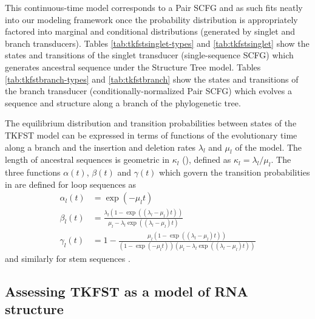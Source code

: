 \documentclass[10pt]{article}
\begin{document}
This continuous-time model corresponds to a Pair SCFG and as such
fits neatly into our modeling framework once the probability
distribution is appropriately factored into marginal and conditional
distributions (generated by singlet and branch transducers).
Tables \ref{tab:tkfstsinglet-types} and \ref{tab:tkfstsinglet} show the states 
and transitions of the singlet transducer (single-sequence SCFG) 
which generates ancestral sequence under the Structure Tree model.
Tables \ref{tab:tkfstbranch-types} and \ref{tab:tkfstbranch} show the states
and transitions of the branch transducer (conditionally-normalized Pair SCFG)
which evolves a sequence and structure along a branch of the phylogenetic tree.

The equilibrium distribution and transition probabilities between states of the TKFST model can be 
expressed in terms of functions of the evolutionary time along a branch
and the insertion and deletion rates $\lambda_l$ and $\mu_l$ of the model.
The length of ancestral sequences is geometric in $\kappa_l$ (), defined as $\kappa_l = \lambda_l / \mu_l$.
The three functions $\alpha(t)$, $\beta(t)$ and $\gamma(t)$ which govern 
the transition probabilities in  are defined
for loop sequences as
\begin{align}
  \alpha_l (t) &= \exp \left( -\mu_l t \right) \nonumber \\
  \beta_l (t) &= \frac{\lambda_l \left( 1 - \exp \left((\lambda_l - \mu_l) t \right) \right)}{\mu_l - \lambda_l \exp \left( (\lambda_l - \mu_l) t \right) } \nonumber \\
  \gamma_l (t) &= 1 - \frac{\mu_l \left( 1 - \exp \left((\lambda_l - \mu_l) t \right) \right)}{\left( 1 - \exp (- \mu_l t) \right) \left(\mu_l - \lambda_l \exp \left( (\lambda_l - \mu_l) t \right) \right) } \nonumber
\end{align}
and similarly for stem sequences \cite{Holmes2004}.




\subsection*{Assessing TKFST as a model of RNA structure}
\end{document}

